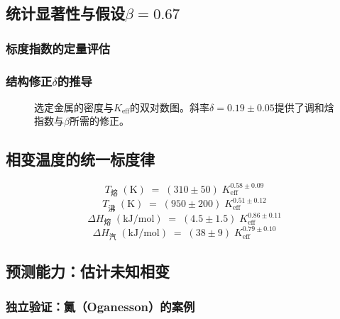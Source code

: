 \documentclass[11pt,a4paper]{article}
\newcommand{\Keff}{K_{\mathrm{eff}}}
\begin{document}
	\subsection{统计显著性与假设\(\beta = 0.67\)}
	\subsubsection{标度指数的定量评估}
	\subsubsection{结构修正\(\delta\)的推导}
	
	\begin{figure}[htbp]
		\centering
		\caption{选定金属的密度与\(\Keff\)的双对数图。斜率\(\delta = 0.19 \pm 0.05\)提供了调和焓指数与\(\beta\)所需的修正。}
		\label{fig:density_scaling}
	\end{figure}
	
	\subsection{相变温度的统一标度律}
	\[
	\boxed{T_{\text{熔}} \;(\mathrm{K}) \;=\; (310 \pm 50) \; \Keff^{0.58 \pm 0.09}}
	\]
	\[
	\boxed{T_{\text{沸}} \;(\mathrm{K}) \;=\; (950 \pm 200) \; \Keff^{0.51 \pm 0.12}}
	\]
	\[
	\boxed{\Delta H_{\text{熔}} \;(\mathrm{kJ/mol}) \;=\; (4.5 \pm 1.5) \; \Keff^{0.86 \pm 0.11}}
	\]
	\[
	\boxed{\Delta H_{\text{汽}} \;(\mathrm{kJ/mol}) \;=\; (38 \pm 9) \; \Keff^{0.79 \pm 0.10}}
	\]
	
	\subsection{预测能力：估计未知相变}
	\subsubsection{独立验证：鿫（Oganesson）的案例}
\end{document}
